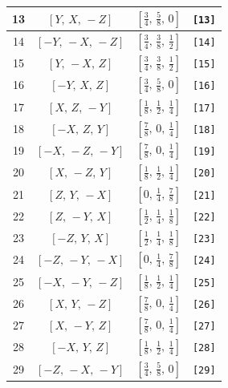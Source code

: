 \documentclass[fleqn,8pt]{jsarticle}
\begin{document}
\begin{longtable}{cccc}
13 & $\left[ Y,\, X,\, - Z \right]$ & $\left[ \frac{3}{4},\, \frac{5}{8},\, 0 \right]$ & {\tt [13]} \\ \hline
14 & $\left[ - Y,\, - X,\, - Z \right]$ & $\left[ \frac{3}{4},\, \frac{3}{8},\, \frac{1}{2} \right]$ & {\tt [14]} \\ \hline
15 & $\left[ Y,\, - X,\, Z \right]$ & $\left[ \frac{3}{4},\, \frac{3}{8},\, \frac{1}{2} \right]$ & {\tt [15]} \\ \hline
16 & $\left[ - Y,\, X,\, Z \right]$ & $\left[ \frac{3}{4},\, \frac{5}{8},\, 0 \right]$ & {\tt [16]} \\ \hline
17 & $\left[ X,\, Z,\, - Y \right]$ & $\left[ \frac{1}{8},\, \frac{1}{2},\, \frac{1}{4} \right]$ & {\tt [17]} \\ \hline
18 & $\left[ - X,\, Z,\, Y \right]$ & $\left[ \frac{7}{8},\, 0,\, \frac{1}{4} \right]$ & {\tt [18]} \\ \hline
19 & $\left[ - X,\, - Z,\, - Y \right]$ & $\left[ \frac{7}{8},\, 0,\, \frac{1}{4} \right]$ & {\tt [19]} \\ \hline
20 & $\left[ X,\, - Z,\, Y \right]$ & $\left[ \frac{1}{8},\, \frac{1}{2},\, \frac{1}{4} \right]$ & {\tt [20]} \\ \hline
21 & $\left[ Z,\, Y,\, - X \right]$ & $\left[ 0,\, \frac{1}{4},\, \frac{7}{8} \right]$ & {\tt [21]} \\ \hline
22 & $\left[ Z,\, - Y,\, X \right]$ & $\left[ \frac{1}{2},\, \frac{1}{4},\, \frac{1}{8} \right]$ & {\tt [22]} \\ \hline
23 & $\left[ - Z,\, Y,\, X \right]$ & $\left[ \frac{1}{2},\, \frac{1}{4},\, \frac{1}{8} \right]$ & {\tt [23]} \\ \hline
24 & $\left[ - Z,\, - Y,\, - X \right]$ & $\left[ 0,\, \frac{1}{4},\, \frac{7}{8} \right]$ & {\tt [24]} \\ \hline
25 & $\left[ - X,\, - Y,\, - Z \right]$ & $\left[ \frac{1}{8},\, \frac{1}{2},\, \frac{1}{4} \right]$ & {\tt [25]} \\ \hline
26 & $\left[ X,\, Y,\, - Z \right]$ & $\left[ \frac{7}{8},\, 0,\, \frac{1}{4} \right]$ & {\tt [26]} \\ \hline
27 & $\left[ X,\, - Y,\, Z \right]$ & $\left[ \frac{7}{8},\, 0,\, \frac{1}{4} \right]$ & {\tt [27]} \\ \hline
28 & $\left[ - X,\, Y,\, Z \right]$ & $\left[ \frac{1}{8},\, \frac{1}{2},\, \frac{1}{4} \right]$ & {\tt [28]} \\ \hline
29 & $\left[ - Z,\, - X,\, - Y \right]$ & $\left[ \frac{3}{4},\, \frac{5}{8},\, 0 \right]$ & {\tt [29]} \\ \hline

\end{longtable}
\end{document}
